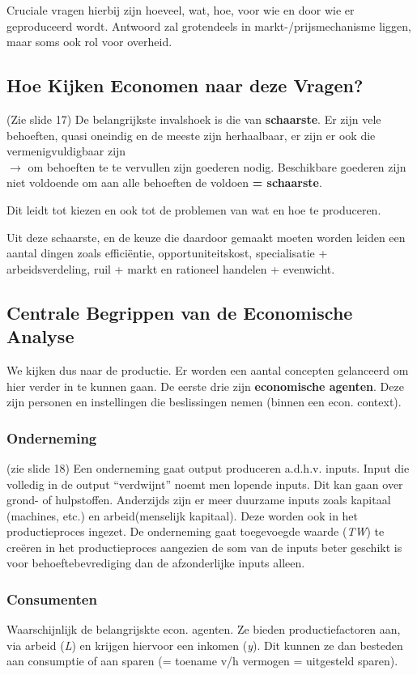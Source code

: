 Cruciale vragen hierbij zijn hoeveel, wat, hoe, voor wie en door wie er geproduceerd wordt. Antwoord zal grotendeels in markt-/prijsmechanisme liggen, maar soms ook rol voor overheid.

\subsection{Hoe Kijken Economen naar deze Vragen?}
(Zie slide 17) De belangrijkste invalshoek is die van \textbf{schaarste}.  Er zijn vele behoeften, quasi oneindig en de meeste zijn herhaalbaar, er zijn er ook die vermenigvuldigbaar zijn\\
$\rightarrow$ om behoeften te te vervullen zijn goederen nodig. Beschikbare goederen zijn niet voldoende om aan alle behoeften de voldoen \textbf{= schaarste}.

Dit leidt tot kiezen en ook tot de problemen van wat en hoe te produceren.

Uit deze schaarste, en de keuze die daardoor gemaakt moeten worden leiden een aantal dingen zoals effici\"{e}ntie, opportuniteitskost, specialisatie + arbeidsverdeling, ruil + markt en rationeel handelen + evenwicht.


\subsection{Centrale Begrippen van de Economische Analyse}
We kijken dus naar de productie. Er worden een aantal concepten gelanceerd om hier verder in te kunnen gaan. De eerste drie zijn \textbf{economische agenten}. Deze zijn personen en instellingen die beslissingen nemen (binnen een econ. context).

\subsubsection{Onderneming}
(zie slide 18) Een onderneming gaat output produceren a.d.h.v. inputs. Input die volledig in de output ``verdwijnt'' noemt men lopende inputs. Dit kan gaan over grond- of hulpstoffen. Anderzijds zijn er meer duurzame inputs zoals kapitaal (machines, etc.) en arbeid(menselijk kapitaal). Deze worden ook in het productieproces ingezet. De onderneming gaat toegevoegde waarde (\textit{TW}) te cre\"{e}ren in het productieproces aangezien de som van de inputs beter geschikt is voor behoeftebevrediging dan de afzonderlijke inputs alleen.

\subsubsection{Consumenten}
Waarschijnlijk de belangrijskte econ. agenten. Ze bieden productiefactoren aan, via arbeid (\textit{L}) en krijgen hiervoor een inkomen (\textit{y}). Dit kunnen ze dan besteden aan consumptie of aan sparen (= toename v/h vermogen = uitgesteld sparen).

